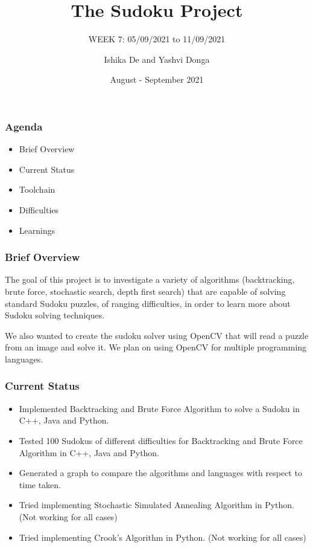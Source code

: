\documentclass{beamer}
\title{The Sudoku Project}
\subtitle{WEEK 7: 05/09/2021 to 11/09/2021}
\author[Ishika | Yashvi]{Ishika De and Yashvi Donga}
\date{August - September 2021}
\begin{document}
\begin{frame}
     \titlepage
\end{frame}
\begin{frame}
     \frametitle{Agenda}
     \begin{itemize}
          \item Brief Overview
          \item Current Status
          \item Toolchain
          \item Difficulties
          \item Learnings
     \end{itemize}
\end{frame}

\begin{frame}
     \frametitle{Brief Overview}
     The goal of this project is to investigate a variety of algorithms (backtracking, brute force, stochastic search, depth first search) that are capable of solving
standard Sudoku puzzles, of ranging difficulties, in order to learn more about Sudoku
solving techniques.\newline

     We also wanted to create the sudoku solver using OpenCV that will read a puzzle from an image and solve it. We plan on using OpenCV for multiple programming languages.
\end{frame}

\begin{frame}
     \frametitle{Current Status}   
     \begin{itemize}
		  \item Implemented Backtracking and Brute Force Algorithm to solve a Sudoku in C++, Java and Python.
		  \item Tested 100 Sudokus of different difficulties for Backtracking and Brute Force Algorithm in C++, Java and Python.
		  \item Generated a graph to compare the algorithms and languages with respect to time taken.
		  \item Tried implementing Stochastic Simulated Annealing Algorithm in Python. (Not working for all cases) 
		  \item Tried implementing Crook's Algorithm in Python. (Not working for all cases)
	 \end{itemize}
\end{frame}
\end{document}
